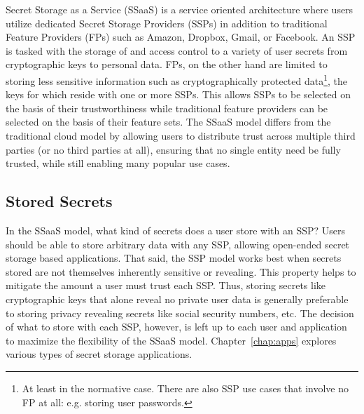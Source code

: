 Secret Storage as a Service (SSaaS) is a service oriented architecture
where users utilize dedicated Secret Storage Providers (SSPs) in
addition to traditional Feature Providers (FPs) such as Amazon,
Dropbox, Gmail, or Facebook. An SSP is tasked with the storage of and
access control to a variety of user secrets from cryptographic keys to
personal data. FPs, on the other hand are limited to storing less
sensitive information such as cryptographically protected
data\footnote{At least in the normative case. There are also SSP use
  cases that involve no FP at all: e.g. storing user passwords.}, the
keys for which reside with one or more SSPs. This allows SSPs to be
selected on the basis of their trustworthiness while traditional
feature providers can be selected on the basis of their feature
sets. The SSaaS model differs from the traditional cloud model by
allowing users to distribute trust across multiple third parties (or
no third parties at all), ensuring that no single entity need be fully
trusted, while still enabling many popular use cases.

\subsection{Stored Secrets}

In the SSaaS model, what kind of secrets does a user store with an
SSP? Users should be able to store arbitrary data with any SSP,
allowing open-ended secret storage based applications. That said, the
SSP model works best when secrets stored are not themselves inherently
sensitive or revealing. This property helps to mitigate the amount a
user must trust each SSP. Thus, storing secrets like cryptographic
keys that alone reveal no private user data is generally preferable to
storing privacy revealing secrets like social security numbers,
etc. The decision of what to store with each SSP, however, is left up
to each user and application to maximize the flexibility of the SSaaS
model. Chapter~\ref{chap:apps} explores various types of secret
storage applications.

